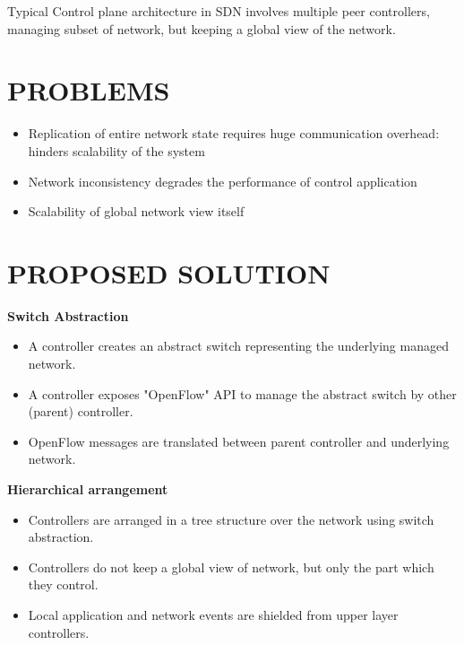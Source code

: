 \documentclass[portrait,a1]{a0poster}
\begin{document}
\vspace{-1cm} %


\begin{multicols}{2} %



\color{DarkSlateGray}
Typical Control plane architecture in SDN involves multiple peer controllers, managing subset of network, but keeping a global view of the network.

\color{SaddleBrown}%
\section*{PROBLEMS}
\color{DarkSlateGray}

\begin{itemize}
    \item Replication of entire network state requires huge communication overhead: hinders scalability of the system
    \item Network inconsistency degrades the performance of control application
    \item Scalability of global network view itself
\end{itemize}


\color{SaddleBrown}
\section*{PROPOSED SOLUTION}
\color{DarkSlateGray}

\textbf{Switch Abstraction}
\begin{itemize}
    \item A controller creates an abstract switch representing the underlying managed network.
    \item A controller exposes "OpenFlow" API to manage the abstract switch by other (parent) controller.
    \item OpenFlow messages are translated between parent controller and underlying network. \\
\end{itemize}

\textbf{Hierarchical arrangement}
\begin{itemize}
    \item Controllers are arranged in a tree structure over the network using switch abstraction.
    \item Controllers do not keep a global view of network, but only the part which they control.
    \item Local application and network events are shielded from upper layer controllers.
\end{itemize}


\end{multicols}
\end{document}
